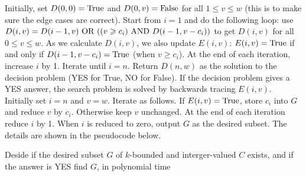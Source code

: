 \documentclass{article}
\begin{document}
Initially, set $D(0,0)=\textup{True}$ and $D(0,v)=\textup{False}$ for all $1\leqslant v\leqslant w$ (this is to make sure the edge cases are correct). Start from $i=1$ and do the following loop: use $D(i,v)=D(i-1,v)\textup{ OR }((v\geqslant c_i)\textup{ AND }D(i-1,v-c_i))$ to get $D(i,v)$ for all $0\leqslant v\leqslant w$. As we calculate $D(i,v)$, we also update $E(i,v)$: $E(i,v)=\textup{True}$ if and only if $D(i-1,v-c_i)=\textup{True}$ (when $v\geqslant c_i$). At the end of each iteration, increase $i$ by 1. Iterate until $i=n$. Return $D(n,w)$ as the solution to the decision problem (YES for True, NO for False). If the decision problem gives a YES answer, the search problem is solved by backwards tracing $E(i,v)$. Initially set $i=n$ and $v=w$. Iterate as follows. If $E(i,v)=\textup{True}$, store $c_i$ into $G$ and reduce $v$ by $c_i$. Otherwise keep $v$ unchanged. At the end of each iteration reduce $i$ by 1. When $i$ is reduced to zero, output $G$ as the desired subset. The details are shown in the pseudocode below.
\begin{algorithm}
\caption{Deside if the desired subset $G$ of $k$-bounded and interger-valued $C$ exists, and if the answer is YES find $G$, in polynomial time}
\begin{algorithmic}[1]
 
\Else{}
	\EndFor
			\Else{}
			\EndIf
		\EndFor
	\EndFor
	\State{}
\EndIf
\EndProcedure

\Else{}
		\EndIf
	\EndFor
\EndIf
\EndProcedure
\end{algorithmic}
\end{algorithm}
\end{document}
